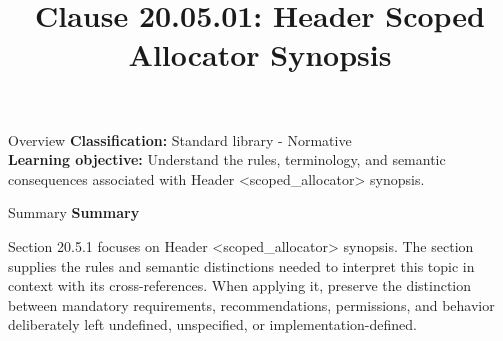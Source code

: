 \documentclass[10pt,letterpaper]{article}
\title{Clause 20.05.01: Header Scoped Allocator Synopsis}
\author{}
\date{}
\begin{document}
\maketitle
\begin{CornellOverviewBox}{Overview}
\textbf{Classification:} Standard library - Normative\\[2pt]
\textbf{Learning objective:} Understand the rules, terminology, and semantic consequences associated with Header <scoped\_allocator> synopsis.
\end{CornellOverviewBox}\begin{CornellSummaryBox}{Summary}
{\sffamily\bfseries\color{Accent} Summary}\par\vspace{3pt}Section 20.5.1 focuses on Header <scoped\_allocator> synopsis. The section supplies the rules and semantic distinctions needed to interpret this topic in context with its cross-references. When applying it, preserve the distinction between mandatory requirements, recommendations, permissions, and behavior deliberately left undefined, unspecified, or implementation-defined.
\end{CornellSummaryBox}
\end{document}
